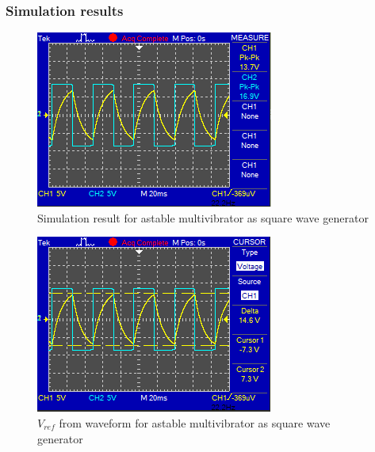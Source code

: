 \documentclass[a4paper, 12pt, english]{article}
\newlength{\simheight}
\begin{document}
\subsubsection{Simulation results}
\begin{figure}[H]
    \centering
    \includegraphics[width=\linewidth, height=\simheight]{images/Square-Wave-Generator-Sim.png}
    \caption{Simulation result for astable multivibrator as square wave generator}
    \label{fig:Simulation result for astable multivibrator as square wave generator}
\end{figure}

\begin{figure}[H]
    \centering
    \includegraphics[width=\linewidth, height=\simheight]{images/Square-Wave-Generator-Vref-Cursor.png}
    \caption{$V_{ref}$ from waveform for astable multivibrator as square wave generator}
    \label{fig:$V_{ref}$ from waveform for astable multivibrator as square wave generator}
\end{figure}
\end{document}
